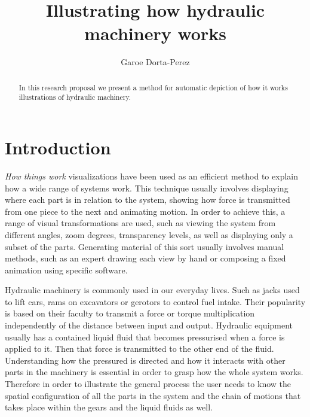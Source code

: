 \documentclass[11pt]{report}
\title{ Illustrating how hydraulic machinery works } \author{Garoe Dorta-Perez}
\begin{document}
\maketitle
\begin{abstract}
In this research proposal we present a method for automatic depiction of how it works illustrations of hydraulic machinery. \end{abstract}


\chapter{Introduction}
\label{ch:intro}


\textit{How things work} visualizations have been used as an efficient method to explain how a wide range of systems work.
This technique usually involves displaying where each part is in relation to the system, showing how force is transmitted from one piece to the next and animating motion. 
In order to achieve this, a range of visual transformations are used, such as viewing the system from different angles, zoom degrees,  transparency levels, as well as displaying only a subset of the parts.
Generating material of this sort usually involves manual methods, such as an expert drawing each view by hand or composing a fixed animation using specific software.

Hydraulic machinery is commonly used in our everyday lives.
Such as jacks used to lift cars, rams on excavators or gerotors to control fuel intake.
Their popularity is based on their faculty to transmit a force or torque multiplication independently of the distance between input and output.  
Hydraulic equipment usually has a contained liquid fluid that becomes pressurised when a force is applied to it.
Then that force is transmitted to the other end of the fluid. 
Understanding how the pressured is directed and how it interacts with other parts in the machinery is essential in order to grasp how the whole system works. 
Therefore in order to illustrate the general process the user needs to know the spatial configuration of all the parts in the system and the chain of motions that takes place within the gears and the liquid fluids as well.
\end{document}
